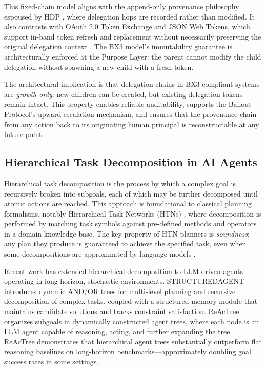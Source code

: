 This fixed-chain model aligns with the append-only provenance philosophy espoused by HDP \cite{draft-hdp-agentic-delegation}, where delegation hops are recorded rather than modified. It also contrasts with OAuth 2.0 Token Exchange and JSON Web Tokens, which support in-band token refresh and replacement without necessarily preserving the original delegation context \cite{draft-hdp-agentic-delegation}. The BX3 model's immutability guarantee is architecturally enforced at the Purpose Layer: the parent cannot modify the child delegation without spawning a new child with a fresh token.

The architectural implication is that delegation chains in BX3-compliant systems are \emph{growth-only}: new children can be created, but existing delegation tokens remain intact. This property enables reliable auditability, supports the Bailout Protocol's upward-escalation mechanism, and ensures that the provenance chain from any action back to its originating human principal is reconstructable at any future point.

\subsection{Hierarchical Task Decomposition in AI Agents}

Hierarchical task decomposition is the process by which a complex goal is recursively broken into subgoals, each of which may be further decomposed until atomic actions are reached. This approach is foundational to classical planning formalisms, notably Hierarchical Task Networks (HTNs) \cite{chathtm}, where decomposition is performed by matching task symbols against pre-defined methods and operators in a domain knowledge base. The key property of HTN planners is \emph{soundness}: any plan they produce is guaranteed to achieve the specified task, even when some decompositions are approximated by language models \cite{chathtm}.

Recent work has extended hierarchical decomposition to LLM-driven agents operating in long-horizon, stochastic environments. STRUCTUREDAGENT \cite{structuredagent} introduces dynamic AND/OR trees for multi-level planning and recursive decomposition of complex tasks, coupled with a structured memory module that maintains candidate solutions and tracks constraint satisfaction. ReAcTree \cite{reactree} organizes subgoals in dynamically constructed agent trees, where each node is an LLM agent capable of reasoning, acting, and further expanding the tree. ReAcTree demonstrates that hierarchical agent trees substantially outperform flat reasoning baselines on long-horizon benchmarks---approximately doubling goal success rates in some settings.

